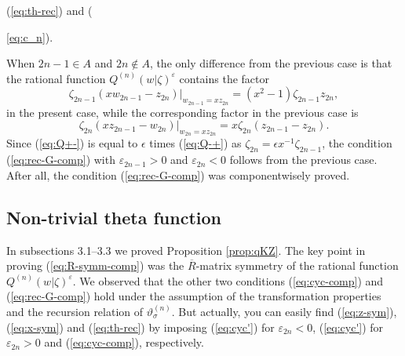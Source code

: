\documentclass[a4paper,10pt]{article}
\begin{document}
(\ref{eq:th-rec}) and ({\ref{eq:c_n}). 

When $2n-1\in A$ and $2n\not\in A$, the only difference 
from the previous case is that the rational function 
$Q^{(n)}(w|\zeta )^{\varepsilon}$ contains the factor 
\begin{equation}
\zeta_{2n-1} (xw_{2n-1}-z_{2n})|_{w_{2n-1}=xz_{2n}}=
(x^2 -1)\zeta_{2n-1}z_{2n}, 
\label{eq:Q+-}
\end{equation}
in the present case, while the corresponding factor 
in the previous case is 
\begin{equation}
\zeta_{2n} (xz_{2n-1}-w_{2n})|_{w_{2n}=xz_{2n}}= 
x\zeta_{2n} (z_{2n-1}-z_{2n}). 
\label{eq:Q-+}
\end{equation}
Since (\ref{eq:Q+-}) is equal to $\epsilon$ times 
(\ref{eq:Q-+}) as 
$\zeta_{2n}=\epsilon x^{-1}\zeta_{2n-1}$, the condition 
(\ref{eq:rec-G-comp}) with $\varepsilon_{2n-1}>0$ 
and $\varepsilon_{2n}<0$ follows from the previous 
case. After all, the condition 
(\ref{eq:rec-G-comp}) was componentwisely proved. 

\subsection{Non-trivial theta function}

In subsections 3.1--3.3 we proved Proposition 
\ref{prop:qKZ}. The key point in proving 
(\ref{eq:R-symm-comp}) was the $\overline{R}$-matrix 
symmetry of the rational function 
$Q^{(n)}(w|\zeta )^{\varepsilon}$. We observed that 
the other two conditions (\ref{eq:cyc-comp}) and 
(\ref{eq:rec-G-comp}) hold under the assumption of 
the transformation properties and 
the recursion relation of $\vartheta^{(n)}_\sigma$. 
But actually, you can easily find (\ref{eq:z-sym}), 
(\ref{eq:x-sym}) and (\ref{eq:th-rec}) by 
imposing (\ref{eq:cyc'}) for $\varepsilon_{2n}<0$, 
(\ref{eq:cyc'}) for $\varepsilon_{2n}>0$ and 
(\ref{eq:cyc-comp}), respectively. 

}
\end{document}
